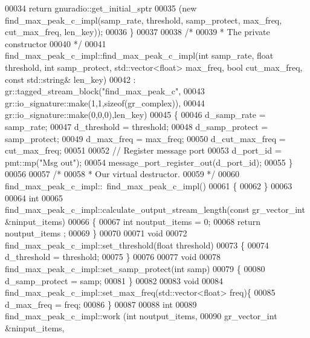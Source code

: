 \begin{DoxyCode}
00034       \textcolor{keywordflow}{return} gnuradio::get\_initial\_sptr
00035         (\textcolor{keyword}{new} find_max_peak_c_impl(samp\_rate, threshold, samp\_protect, max\_freq, cut\_max\_freq, len\_key));
00036     \}
00037 
00038     \textcolor{comment}{/*}
00039 \textcolor{comment}{     * The private constructor}
00040 \textcolor{comment}{     */}
00041     find_max_peak_c_impl::find_max_peak_c_impl(\textcolor{keywordtype}{int} samp_rate, \textcolor{keywordtype}{float} threshold, \textcolor{keywordtype}{int} samp\_protect, 
      std::vector<float> max\_freq, \textcolor{keywordtype}{bool} cut\_max\_freq, \textcolor{keyword}{const} std::string& len\_key)
00042       : gr::tagged\_stream\_block(\textcolor{stringliteral}{"find\_max\_peak\_c"},
00043               gr::io\_signature::make(1,1,sizeof(gr\_complex)),
00044               gr::io\_signature::make(0,0,0),len\_key)
00045     \{
00046         d_samp_rate = samp_rate;
00047         d_threshold = threshold;
00048         d_samp_protect = samp\_protect;
00049         d_max_freq = max\_freq;
00050         d_cut_max_freq = cut\_max\_freq;
00051         
00052         \textcolor{comment}{// Register message port}
00053         d_port_id = pmt::mp(\textcolor{stringliteral}{"Msg out"});
00054         message\_port\_register\_out(d_port_id);
00055     \}
00056 
00057     \textcolor{comment}{/*}
00058 \textcolor{comment}{     * Our virtual destructor.}
00059 \textcolor{comment}{     */}
00060     find_max_peak_c_impl::~find_max_peak_c_impl()
00061     \{
00062     \}
00063 
00064     \textcolor{keywordtype}{int}
00065     find_max_peak_c_impl::calculate_output_stream_length(\textcolor{keyword}{const} gr\_vector\_int &ninput\_items)
00066     \{
00067       \textcolor{keywordtype}{int} noutput\_items = 0;
00068       \textcolor{keywordflow}{return} noutput\_items ;
00069     \}
00070     
00071     \textcolor{keywordtype}{void}
00072     find_max_peak_c_impl::set_threshold(\textcolor{keywordtype}{float} threshold)
00073     \{
00074       d_threshold = threshold;
00075     \}
00076     
00077     \textcolor{keywordtype}{void}
00078     find_max_peak_c_impl::set_samp_protect(\textcolor{keywordtype}{int} samp)
00079     \{
00080       d_samp_protect = samp;
00081     \}
00082     
00083     \textcolor{keywordtype}{void}
00084     find_max_peak_c_impl::set_max_freq(std::vector<float> freq)\{
00085         d_max_freq = freq;
00086     \}
00087 
00088     \textcolor{keywordtype}{int}
00089     find_max_peak_c_impl::work (\textcolor{keywordtype}{int} noutput\_items,
00090                        gr\_vector\_int &ninput\_items,

\end{DoxyCode}
